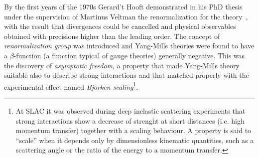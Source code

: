 By the first years of the 1970s Gerard't Hooft demonstrated in his
PhD thesis under the supervision of  Martinus Veltman the
renormalization for the theory~\cite{tHooft1971173,Hooft1971167}, 
with the result that divergences could be 
cancelled and physical observables obtained with precisions higher than the 
leading order. 
The concept of \textit{renormalization group} was introduced and 
Yang-Mills theories were found to have a $\beta$-function (a function 
typical of gauge theories) generally negative. This was the discovery 
of \textit{asymptotic freedom}, a property that made Yang-Mills theory 
suitable also to describe strong interactions and that matched properly 
with the experimental effect named \textit{Bjorken scaling}\footnote{At 
SLAC it was observed during deep inelastic scattering experiments that 
strong interactions show a decrease of strenght at short distances (i.e. 
high momentum transfer) together with a scaling behaviour. A property is 
said to ``scale'' when it depends only by dimensionless kinematic quantities, 
such as a scattering angle or the ratio of the energy to a momentum transfer.}. 


